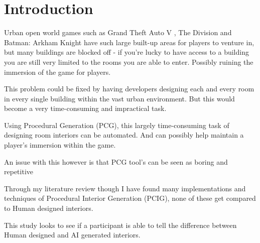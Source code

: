 \section{Introduction}

Urban open world games such as Grand Theft Auto V \cite{game:gta}, The Division \cite{game:division} and Batman: Arkham Knight \cite{game:arkham-knight}
have such large built-up areas for players to venture in, but many buildings are blocked off - 
if you're lucky to have access to a building you are still very limited to the rooms you are able to enter.
Possibly ruining the immersion of the game for players.

This problem could be fixed by having developers designing each and every room in every single building within the vast urban environment.
But this would become a very time-consuming and impractical task.

Using Procedural Generation (PCG), this largely time-consuming task of designing room interiors can be automated. And can possibly help maintain a player's immersion within the game.

An issue with this however is that PCG tool's can be seen as boring and repetitive \cite{pcg_in_gd} 

Through my literature review though I have found many implementations and techniques of Procedural Interior Generation (PCIG), none of these get compared to Human designed interiors. 

This study looks to see if a participant is able to tell the difference between Human designed and AI generated interiors.







